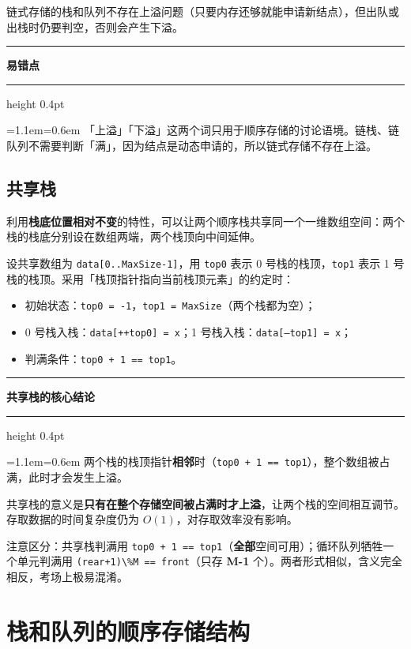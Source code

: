 \documentclass[11pt,openany,UTF8]{ctexbook}
\newcommand{\callouthead}[2]{%
  \par\addvspace{7pt}\noindent
  {\color{#1}\rule[-0.15em]{3pt}{1.05em}}\hspace{0.5em}%
  {\bfseries\color{#1}#2}\par\nobreak\vspace{-0.35em}%
  {\color{rulesep}\hrule height 0.4pt}\nobreak\vspace{0.45em}%
  \begingroup\small\setlength{\parindent}{0pt}%
  \leftskip=1.1em\rightskip=0.6em\noindent\ignorespaces}
\newcommand{\calloutend}{\par\endgroup\addvspace{7pt}}
\newenvironment{callkey}[1]{\callouthead{keybar}{#1}}{\calloutend}
\newenvironment{callwarn}[1]{\callouthead{warnbar}{#1}}{\calloutend}
\begin{document}
链式存储的栈和队列不存在上溢问题（只要内存还够就能申请新结点），但出队或出栈时仍要判空，否则会产生下溢。

\begin{callwarn}{易错点}
「上溢」「下溢」这两个词只用于顺序存储的讨论语境。链栈、链队列不需要判断「满」，因为结点是动态申请的，所以链式存储不存在上溢。

\end{callwarn}

\subsection{共享栈}

利用\textbf{栈底位置相对不变}的特性，可以让两个顺序栈共享同一个一维数组空间：两个栈的栈底分别设在数组两端，两个栈顶向中间延伸。

设共享数组为 \texttt{data[0..MaxSize-1]\allowbreak{}}，用 \texttt{top0} 表示 0 号栈的栈顶，\texttt{top1} 表示 1 号栈的栈顶。采用「栈顶指针指向当前栈顶元素」的约定时：

\begin{itemize}
\item 初始状态：\texttt{top0 =\allowbreak{} -1}，\texttt{top1 =\allowbreak{} MaxSize}（两个栈都为空）；
\item 0 号栈入栈：\texttt{data[+\allowbreak{}+\allowbreak{}top0]\allowbreak{} =\allowbreak{} x}；1 号栈入栈：\texttt{data[--top1]\allowbreak{} =\allowbreak{} x}；
\item 判满条件：\texttt{top0 +\allowbreak{} 1 =\allowbreak{}=\allowbreak{} top1}。
\end{itemize}
\begin{callkey}{共享栈的核心结论}
两个栈的栈顶指针\textbf{相邻}时（\texttt{top0 +\allowbreak{} 1 =\allowbreak{}=\allowbreak{} top1}），整个数组被占满，此时才会发生上溢。

共享栈的意义是\textbf{只有在整个存储空间被占满时才上溢}，让两个栈的空间相互调节。存取数据的时间复杂度仍为 $O(1)$，对存取效率没有影响。

注意区分：共享栈判满用 \texttt{top0 +\allowbreak{} 1 =\allowbreak{}=\allowbreak{} top1}（\textbf{全部}空间可用）；循环队列牺牲一个单元判满用 \texttt{(rear+\allowbreak{}1)\allowbreak{}\textbackslash{}\%M =\allowbreak{}=\allowbreak{} front}（只存 \textbf{M-1} 个）。两者形式相似，含义完全相反，考场上极易混淆。

\end{callkey}

\section{栈和队列的顺序存储结构}
\end{document}
